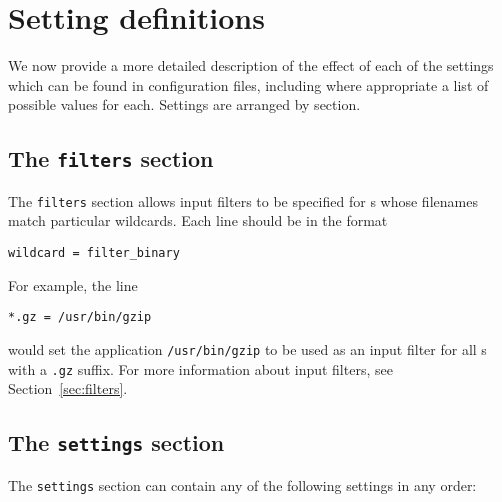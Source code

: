 \section{Setting definitions}

We now provide a more detailed description of the effect of each of the
settings which can be found in configuration files, including where appropriate
a list of possible values for each. Settings are arranged by section.

\subsection{The {\tt filters} section}

The {\tt filters} section allows input filters to be specified for \datafile s
whose filenames match particular wildcards. Each line should be in the format
\begin{verbatim}
wildcard = filter_binary
\end{verbatim}
For example, the line
\begin{verbatim}
*.gz = /usr/bin/gzip
\end{verbatim}
would set the application {\tt /usr/bin/gzip} to be used as an input filter for
all \datafile s with a {\tt .gz} suffix. For more information about input
filters, see Section~\ref{sec:filters}.

\subsection{The {\tt settings} section}
\label{sec:configfile_settings}

The {\tt settings} section can contain any of the following settings in any order:

